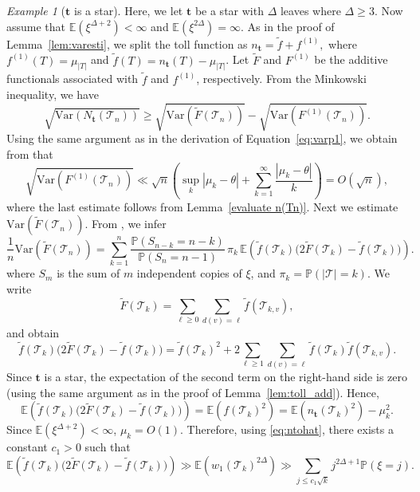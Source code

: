 \documentclass[article]{amsart}
\newcommand{\Var} {\mathrm {Var}}
\newcommand{\Prob} {\mathbb {P}}
\newcommand{\prob}[1]{\Prob\left(#1\right)}
\newcommand{\tc}{\mathcal{T}}
\newcommand{\st}{\textbf{t}}
\newcommand{\N}{N_{\st}}
\newcommand{\n}{n_{\st}}
\newcommand{\E}{\mathbb{E}}
\theoremstyle{definition}
\theoremstyle{remark}
\newtheorem{example}[theorem]{Example}
\begin{document}
\begin{example}[$\st$ is a star]
    Here, we let $\st$ be a star with $\Delta$ leaves where $\Delta\geq 3$. Now assume that $\E(\xi^{\Delta+2})<\infty$ and $\E(\xi^{2\Delta})=\infty$. As in the proof of Lemma~\ref{lem:varesti}, we split the toll function as
    $
    \n=\tilde{f}+f^{(1)},
    $
    where $f^{(1)}(T)=\mu_{|T|}$ and $\tilde{f}(T)=\n(T)-\mu_{|T|}$. Let $\tilde {F}$ and $F^{(1)}$ be the additive functionals associated with $\tilde{f}$ and $f^{(1)}$, respectively. From the Minkowski inequality, we have
    \begin{equation}\label{eq:var_break}
        \sqrt{\Var(\N(\tc_n))}\geq \sqrt{\Var(\tilde{F}(\tc_n))}-\sqrt{\Var(F^{(1)}(\tc_n))}.
    \end{equation}
    Using the same argument as in the derivation of Equation~\eqref{eq:varp1}, we obtain from \cite[Theorem 6.7]{J16} that 
    \begin{equation}\label{eq:varF1}
        \sqrt{\Var(F^{(1)}(\tc_n))}\ll \sqrt{n} \left(\sup_{k}|\mu_k-\theta|+\sum_{k=1}^{\infty}\frac{|\mu_k-\theta|}{k}\right)=O(\sqrt{n}),
    \end{equation}
    where the last estimate follows from Lemma~\ref{evaluate n(Tn)}. Next we estimate $\Var(\tilde{F}(\tc_n))$. From \cite[Equation~(6.27)]{J16}, we infer
    \[
    \frac{1}{n}\mathrm{Var}(\tilde  F(\tc_n))=\sum_{k=1}^{n}
\frac{\mathbb{P}(S_{n-k}=n-k)}{\mathbb{P}(S_n = n-1)}
\, \pi_k \, \mathbb{E}\!\left(\tilde  f(\tc_k)\bigl(2\tilde  F(\tc_k)-\tilde f(\tc_k)\bigr) \right).
    \]
    where $S_m$ is the sum of $m$ independent copies of $\xi$, and $\pi_k=\prob{|\tc|=k}$. We write
    \[
    \tilde F(\tc_k)=\sum_{\ell\geq 0}\sum_{d(v)=\ell} \tilde f(\tc_{k,v}),
    \]
    and obtain 
    \[
    \tilde f(\tc_k)\bigl(2\tilde F(\tc_k)-\tilde f(\tc_k)\bigr)=\tilde f(\tc_k)^2+2\sum_{\ell\geq 1}\sum_{d(v)=\ell} \tilde f(\tc_k)\tilde f(\tc_{k,v}).
    \]
    Since $\st$ is a star, the expectation of the second term on the right-hand side is zero (using the same argument as in the proof of Lemma~\ref{lem:toll_add}). Hence,
    \[
    \mathbb{E}\!\left( \tilde  f(\tc_k)\bigl(2\tilde F(\tc_k)-\tilde f(\tc_k)\bigr) \right)=\E(f(\tc_k)^2)=\E(\n(\tc_k)^2)-\mu_k^2.
    \]
    Since $\E(\xi^{\Delta+2})<\infty$, $\mu_k=O(1)$. Therefore, using \eqref{eq:ntohat}, there exists a constant $c_1>0$ such that 
    \[
    \mathbb{E}\!\left( \tilde  f(\tc_k)\bigl(2\tilde  F(\tc_k)-\tilde  f(\tc_k)\bigr) \right) \gg \E(w_1(\tc_k)^{2\Delta})\gg \sum_{j\leq c_1\sqrt{k}}j^{2\Delta+1}\prob{\xi=j}. 
\]
\end{example}
\end{document}
